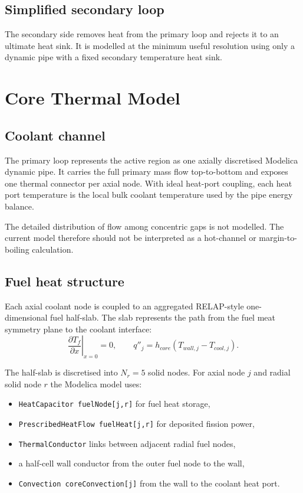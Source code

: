 \documentclass[11pt]{article}
\begin{document}
\subsection{Simplified secondary loop}
The secondary side removes heat from the primary loop and rejects it to
an ultimate heat sink.  It is modelled at the minimum useful resolution using
only a dynamic pipe with a fixed secondary temperature heat sink.

\section{Core Thermal Model}

\subsection{Coolant channel}

The primary loop represents the active region as one axially discretised
Modelica dynamic pipe.  It carries the full primary mass flow top-to-bottom
and exposes one thermal connector per axial node.  With ideal heat-port
coupling, each heat port temperature is the local bulk coolant temperature
used by the pipe energy balance.

The detailed distribution of flow among concentric gaps is not modelled.
The current model therefore should not be interpreted as a hot-channel or
margin-to-boiling calculation.

\subsection{Fuel heat structure}

Each axial coolant node is coupled to an aggregated RELAP-style one-dimensional
fuel half-slab.  The slab represents the path from the fuel meat symmetry
plane to the coolant interface:
\[
\left.\frac{\partial T_f}{\partial x}\right|_{x=0}=0,
\qquad
q''_j = h_{core}\left(T_{wall,j}-T_{cool,j}\right).
\]

The half-slab is discretised into $N_r=5$ solid nodes.  For axial node $j$
and radial solid node $r$ the Modelica model uses:
\begin{itemize}
  \item \texttt{HeatCapacitor fuelNode[j,r]} for fuel heat storage,
  \item \texttt{PrescribedHeatFlow fuelHeat[j,r]} for deposited fission power,
  \item \texttt{ThermalConductor} links between adjacent radial fuel nodes,
  \item a half-cell wall conductor from the outer fuel node to the wall,
  \item \texttt{Convection coreConvection[j]} from the wall to the coolant heat port.
\end{itemize}
\end{document}

